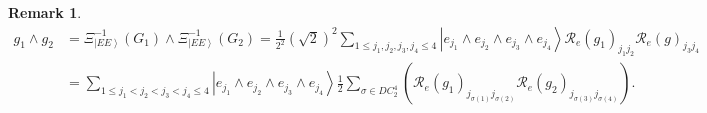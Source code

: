 \documentclass[aps,preprint]{revtex4}%
\newtheorem{remark}[theorem]{Remark}
\begin{document}
\begin{remark}%
\begin{align}
g_{1}\wedge g_{2}  &  =\Xi_{\left\vert EE\right\rangle }^{-1}\left(
G_{1}\right)  \wedge\Xi_{\left\vert EE\right\rangle }^{-1}\left(
G_{2}\right)  =\frac{1}{2^{2}}\left(  \sqrt{2}\right)  ^{2}\sum_{1\leq
j_{1},j_{2},j_{3},j_{4}\leq4}\left\vert e_{j_{1}}\wedge e_{j_{2}}\wedge
e_{j_{3}}\wedge e_{j_{4}}\right\rangle \mathcal{R}_{e}\left(  g_{1}\right)
_{j_{1}j_{2}}\mathcal{R}_{e}\left(  g\right)  _{j_{3}j_{4}}\\
&  =\sum_{1\leq j_{1}<j_{2}<j_{3}<j_{4}\leq4}\left\vert e_{j_{1}}\wedge
e_{j_{2}}\wedge e_{j_{3}}\wedge e_{j_{4}}\right\rangle \frac{1}{2}\sum
_{\sigma\in DC_{2}^{4}}\left(  \mathcal{R}_{e}\left(  g_{1}\right)
_{j_{\sigma\left(  1\right)  }j_{\sigma\left(  2\right)  }}\mathcal{R}%
_{e}\left(  g_{2}\right)  _{j_{\sigma\left(  3\right)  }j_{\sigma\left(
4\right)  }}\right)  .
\end{align}

\end{remark}
\end{document}
